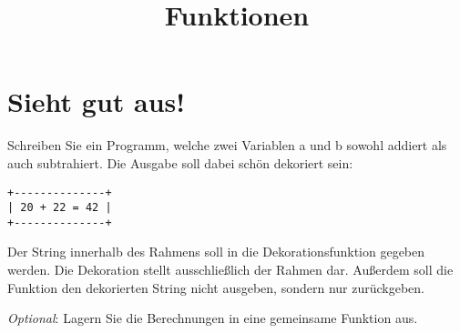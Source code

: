 

\title{Funktionen}

\ihead{}
\chead{}
\ohead{}
\ifoot{}
\cfoot{\pagemark}
\ofoot{}



\setlength{\parskip}{1em}
\setlength{\parindent}{0em}
\renewcommand{\baselinestretch}{1.15}



\docheader

\section{Sieht gut aus!}

Schreiben Sie ein Programm, welche zwei Variablen a und b sowohl addiert als auch subtrahiert. Die Ausgabe soll dabei schön dekoriert sein:

\begin{lstlisting}
+--------------+
| 20 + 22 = 42 |
+--------------+
\end{lstlisting}

Der String innerhalb des Rahmens soll in die Dekorationsfunktion gegeben werden. Die Dekoration stellt ausschließlich der Rahmen dar. Außerdem soll die Funktion den dekorierten String nicht ausgeben, sondern nur zurückgeben.

\textit{Optional}: Lagern Sie die Berechnungen in eine gemeinsame Funktion aus.


